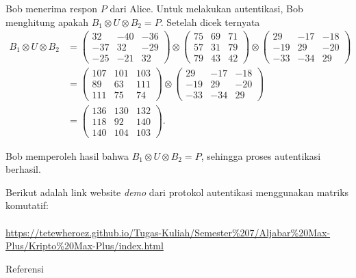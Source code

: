 \documentclass[aspectratio=169]{beamer}
\theoremstyle{definition}
\numberwithin{definisi}{section}
\begin{document}
\begin{frame}
  \frametitle{\insertsection}
  Bob menerima respon $P$ dari Alice. Untuk melakukan autentikasi, Bob menghitung apakah $B_1 \otimes U \otimes B_2 = P$.
  Setelah dicek ternyata
  \begin{align*}
    B_1 \otimes U \otimes B_2 & =
    \begin{pmatrix}
      32  & -40 & -36 \\
      -37 & 32  & -29 \\
      -25 & -21 & 32
    \end{pmatrix}
    \otimes
    \begin{pmatrix}
      75 & 69 & 71 \\
      57 & 31 & 79 \\
      79 & 43 & 42
    \end{pmatrix}
    \otimes
    \begin{pmatrix}
      29  & -17 & -18 \\
      -19 & 29  & -20 \\
      -33 & -34 & 29
    \end{pmatrix}               \\
                              & =
    \begin{pmatrix}
      107 & 101 & 103 \\
      89  & 63  & 111 \\
      111 & 75  & 74
    \end{pmatrix}
    \otimes
    \begin{pmatrix}
      29  & -17 & -18 \\
      -19 & 29  & -20 \\
      -33 & -34 & 29
    \end{pmatrix}               \\
                              & =
    \begin{pmatrix}
      136 & 130 & 132 \\
      118 & 92  & 140 \\
      140 & 104 & 103
    \end{pmatrix}.
  \end{align*}

  Bob memperoleh hasil bahwa $B_1 \otimes U \otimes B_2 = P$, sehingga proses autentikasi berhasil.

\end{frame}

\begin{frame}
  Berikut adalah link website \textit{demo} dari protokol autentikasi menggunakan matriks komutatif: \\~\\
  \href{https://tetewheroez.github.io/Tugas-Kuliah/Semester\%207/Aljabar\%20Max-Plus/Kripto\%20Max-Plus/index.html}{https://tetewheroez.github.io/Tugas-Kuliah/Semester\%207/Aljabar\%20Max-Plus/Kripto\%20Max-Plus/index.html}
\end{frame}


\begin{frame}[allowframebreaks]{\Large Referensi}
  \printbibliography
\end{frame}
\end{document}
